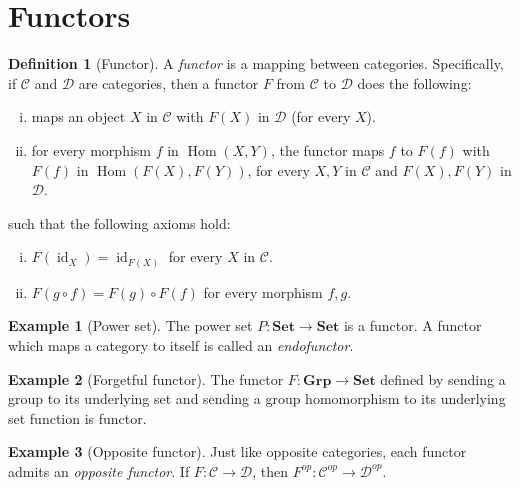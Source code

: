 \documentclass[12pt]{book}
\theoremstyle{definition}
\newtheorem{definition}{Definition}[section]
\newtheorem{defexample}{Example}[definition]
\theoremstyle{plain}
\theoremstyle{definition}
\DeclareMathOperator{\id}{id}
\DeclareMathOperator{\Hom}{Hom}
\begin{document}
\section{Functors}
\begin{definition}[Functor]
  A \emph{functor} is a mapping between categories. Specifically, if $\mathscr{C}$ and $\mathscr{D}$ are categories, then a functor $F$ from $\mathscr{C}$ to $\mathscr{D}$ does the following:
  \begin{enumerate}[i.]
    \item maps an object $X$ in $\mathscr{C}$ with $F(X)$ in $\mathscr{D}$ (for every $X$).
    \item for every morphism $f$ in $\Hom(X, Y)$, the functor maps $f$ to $F(f)$ with $F(f)$ in $\Hom(F(X), F(Y))$, for every $X, Y$ in $\mathscr{C}$ and $F(X), F(Y)$ in $\mathscr{D}$.
  \end{enumerate}
  such that the following axioms hold:
  \begin{enumerate}[i.]
    \item $F(\id_X) = \id_{F(X)}$ for every $X$ in $\mathscr{C}$.
    \item $F(g \circ f) = F(g) \circ F(f)$ for every morphism $f, g$.
  \end{enumerate}
\end{definition}

\begin{defexample}[Power set]
  The power set $P : \mathbf{Set} \rightarrow \mathbf{Set}$ is a functor. A functor which maps a category to itself is called an \emph{endofunctor}.
\end{defexample}

\begin{defexample}[Forgetful functor]
  The functor $F : \mathbf{Grp} \rightarrow \mathbf{Set}$ defined by sending a group to its underlying set and sending a group homomorphism to its underlying set function is functor.
\end{defexample}

\begin{defexample}[Opposite functor]
  Just like opposite categories, each functor admits an \emph{opposite functor}. If $F : \mathscr{C} \rightarrow \mathscr{D}$, then $F^{op} : \mathscr{C}^{op} \rightarrow \mathscr{D}^{op}$.
\end{defexample}
\end{document}
